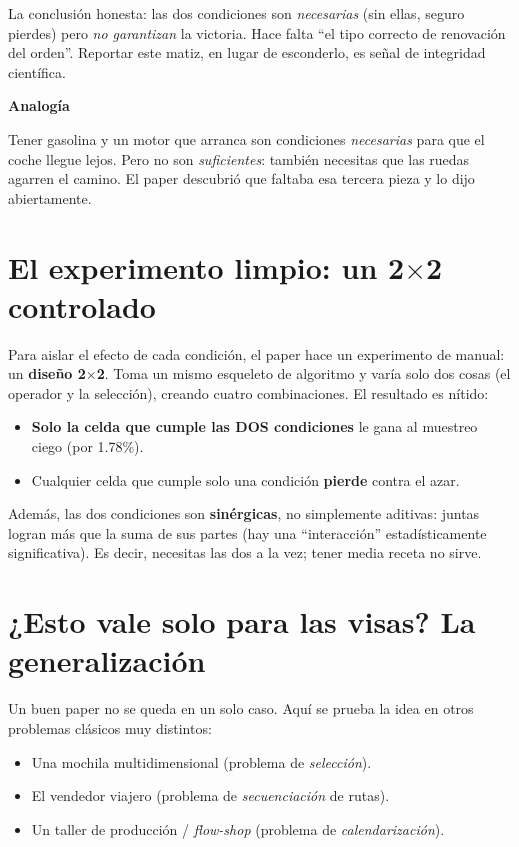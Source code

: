 \documentclass[11pt]{article}
\newcommand{\cajacolor}{cajadato}
\newenvironment{caja}[2]{%
  \par\medskip\noindent
  \renewcommand{\cajacolor}{#1}%
  \begin{lrbox}{\cajabox}%
  \begin{minipage}{\dimexpr\linewidth-2\fboxsep-1.2em\relax}%
  \setlength{\parskip}{0.5em}%
  {\bfseries\color{acento2}#2}\par\smallskip}
  {\end{minipage}%
  \end{lrbox}%
  \setlength{\fboxsep}{0.6em}%
  \colorbox{\cajacolor}{\usebox{\cajabox}}\par\medskip}
\newcommand{\analogia}[1]{\begin{caja}{cajaanalogia}{Analogía}#1\end{caja}}
\newcommand{\term}[1]{\textbf{\color{acento}#1}}
\begin{document}
La conclusión honesta: las dos condiciones son \emph{necesarias} (sin ellas, seguro pierdes) pero \emph{no garantizan} la victoria. Hace falta ``el tipo correcto de renovación del orden''. Reportar este matiz, en lugar de esconderlo, es señal de integridad científica.

\analogia{
Tener gasolina y un motor que arranca son condiciones \emph{necesarias} para que el coche llegue lejos. Pero no son \emph{suficientes}: también necesitas que las ruedas agarren el camino. El paper descubrió que faltaba esa tercera pieza y lo dijo abiertamente.
}

\section{El experimento limpio: un 2$\times$2 controlado}

Para aislar el efecto de cada condición, el paper hace un experimento de manual: un \term{diseño 2$\times$2}. Toma un mismo esqueleto de algoritmo y varía solo dos cosas (el operador y la selección), creando cuatro combinaciones. El resultado es nítido:

\begin{itemize}[leftmargin=1.4em]
  \item \textbf{Solo la celda que cumple las DOS condiciones} le gana al muestreo ciego (por 1.78\%).
  \item Cualquier celda que cumple solo una condición \textbf{pierde} contra el azar.
\end{itemize}

Además, las dos condiciones son \term{sinérgicas}, no simplemente aditivas: juntas logran más que la suma de sus partes (hay una ``interacción'' estadísticamente significativa). Es decir, necesitas las dos a la vez; tener media receta no sirve.

\section{¿Esto vale solo para las visas? La generalización}

Un buen paper no se queda en un solo caso. Aquí se prueba la idea en otros problemas clásicos muy distintos:

\begin{itemize}[leftmargin=1.4em]
  \item Una mochila multidimensional (problema de \emph{selección}).
  \item El vendedor viajero (problema de \emph{secuenciación} de rutas).
  \item Un taller de producción / \emph{flow-shop} (problema de \emph{calendarización}).
\end{itemize}
\end{document}
